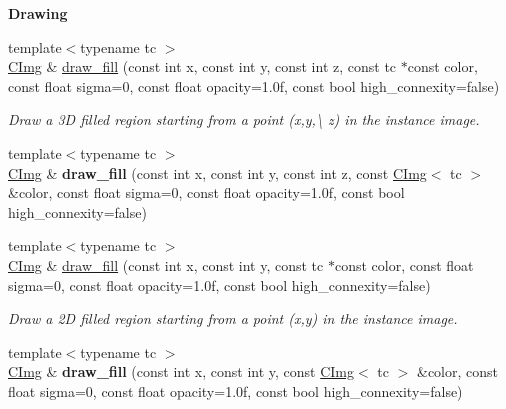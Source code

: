 \begin{Indent}{\bf Drawing}
\begin{DoxyCompactItemize}
\item 
{\footnotesize template$<$typename tc $>$ }\\\hyperlink{structcimg__library_1_1_c_img}{C\-Img} \& \hyperlink{structcimg__library_1_1_c_img_a65c311df00fb50f612f84da7242a5a96}{draw\-\_\-fill} (const int x, const int y, const int z, const tc $\ast$const color, const float sigma=0, const float opacity=1.\-0f, const bool high\-\_\-connexity=false)
\begin{DoxyCompactList}\small\item\em Draw a 3\-D filled region starting from a point ({\ttfamily x},{\ttfamily y},\textbackslash{} z) in the instance image. \end{DoxyCompactList}\item 
\hypertarget{structcimg__library_1_1_c_img_a3d8dd6e666177c7b58bd8fa62fa08799}{{\footnotesize template$<$typename tc $>$ }\\\hyperlink{structcimg__library_1_1_c_img}{C\-Img} \& {\bfseries draw\-\_\-fill} (const int x, const int y, const int z, const \hyperlink{structcimg__library_1_1_c_img}{C\-Img}$<$ tc $>$ \&color, const float sigma=0, const float opacity=1.\-0f, const bool high\-\_\-connexity=false)}\label{structcimg__library_1_1_c_img_a3d8dd6e666177c7b58bd8fa62fa08799}

\item 
{\footnotesize template$<$typename tc $>$ }\\\hyperlink{structcimg__library_1_1_c_img}{C\-Img} \& \hyperlink{structcimg__library_1_1_c_img_ab7bce87559fe85b54aabcd87cca68d31}{draw\-\_\-fill} (const int x, const int y, const tc $\ast$const color, const float sigma=0, const float opacity=1.\-0f, const bool high\-\_\-connexity=false)
\begin{DoxyCompactList}\small\item\em Draw a 2\-D filled region starting from a point ({\ttfamily x},{\ttfamily y}) in the instance image. \end{DoxyCompactList}\item 
\hypertarget{structcimg__library_1_1_c_img_aeadae4e682445f59ed41ec477ed70f42}{{\footnotesize template$<$typename tc $>$ }\\\hyperlink{structcimg__library_1_1_c_img}{C\-Img} \& {\bfseries draw\-\_\-fill} (const int x, const int y, const \hyperlink{structcimg__library_1_1_c_img}{C\-Img}$<$ tc $>$ \&color, const float sigma=0, const float opacity=1.\-0f, const bool high\-\_\-connexity=false)}\label{structcimg__library_1_1_c_img_aeadae4e682445f59ed41ec477ed70f42}


\end{DoxyCompactItemize}
\end{Indent}
